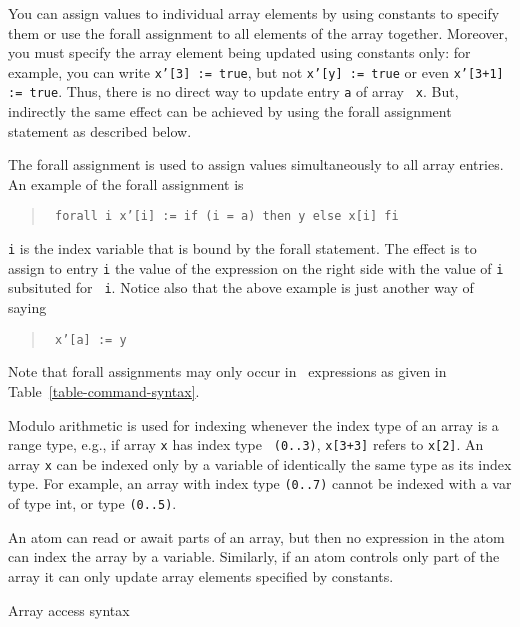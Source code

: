 You can assign values to individual array elements by using
constants to specify them or use the forall assignment to all elements
of the array together.
Moreover, you must specify the array element being
updated using constants only: for example, you can write {\tt x'[3] :=
true}, but not {\tt x'[y] := true} or even {\tt x'[3+1] := true}.
Thus, there is no direct way to update entry {\tt a} of array {\tt
x}. But, indirectly the same effect can be achieved by using the
forall assignment statement as described below. 

The forall assignment is used to assign values simultaneously to all
array entries. An example of the forall assignment is 

\begin{quote} \tt
forall i x'[i] := if (i = a) then y else x[i] fi
\end{quote}

{\tt i} is the index variable that is bound by the forall
statement. The effect is to assign to entry {\tt i} the value of the
expression on the right side with the value of {\tt i} subsituted for {\tt
i}. Notice also that the above example is just another way of saying 

\begin{quote} \tt
x'[a] := y
\end{quote}

Note that forall assignments may only occur in
\command\ expressions as given in Table~\ref{table-command-syntax}.

Modulo arithmetic is used for indexing whenever the index type of an
array is a range type, e.g., if array {\tt x} has index type {\tt
(0..3)}, {\tt x[3+3]} refers to {\tt x[2]}. An array {\tt x} can be
indexed only by a variable of identically the same type as its index
type. For example, an array with index type {\tt (0..7)} cannot be
indexed with a var of type int, or type {\tt (0..5)}.

An atom can read or await parts of an array, but then no expression in
the atom can index the array by a variable. Similarly, if an atom
controls only part of the array it can only update array elements
specified by constants.

\begin{table}\boxed{\begin{tabbing}
\adeclare\ \gramdef\ \LSQBRAC\intconst\ $|$ \element\RSQBRAC \\[3ex]
\arefer\ \gramdef\ \LSQBRAC\numexpr\ $|$ \enumvar\ $|$ \element\RSQBRAC \\[3ex]
\aassign\ \gramdef\ \adeclare\
\end{tabbing}}
\caption{Array access syntax}
\label{table-array-access-syntax}
\end{table}

